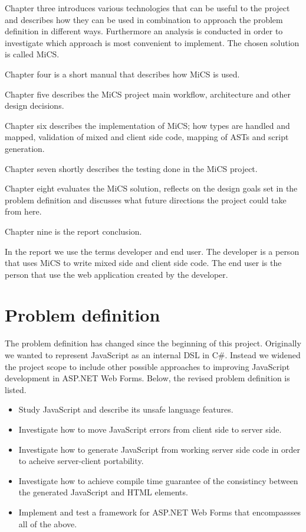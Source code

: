 	Chapter three introduces various technologies that can be useful to the project and describes how they can be used in combination to approach the problem definition in different ways. Furthermore an analysis is conducted in order to investigate which approach is most convenient to implement. The chosen solution is called MiCS.

	Chapter four is a short manual that describes how MiCS is used.

	Chapter five describes the MiCS project main workflow, architecture and other design decisions.

	Chapter six describes the implementation of MiCS; how types are handled and mapped, validation of mixed and client side code, mapping of ASTs and script generation.

	Chapter seven shortly describes the testing done in the MiCS project.
	
	Chapter eight evaluates the MiCS solution, reflects on the design goals set in the problem definition and discusses what future directions the project could take from here.

	Chapter nine is the report conclusion.

	In the report we use the terms developer and end user. The developer is a person that uses MiCS to write mixed side and client side code. The end user is the person that use the web application created by the developer.


\section{Problem definition}
	The problem definition has changed since the beginning of this project. Originally we wanted to represent JavaScript as an internal DSL in C\#. Instead we widened the project scope to include other possible approaches to improving JavaScript development in ASP.NET Web Forms. Below, the revised problem definition is listed.

	\begin{itemize}
		\item Study JavaScript and describe its unsafe language features.
		\item Investigate how to move JavaScript errors from client side to server side. 
		\item Investigate how to generate JavaScript from working server side code in order to acheive server-client portability.
		\item Investigate how to achieve compile time guarantee of the consistincy between the generated JavaScript and HTML elements.
		\item Implement and test a framework for ASP.NET Web Forms that encompassses all of the above.
	\end{itemize}

